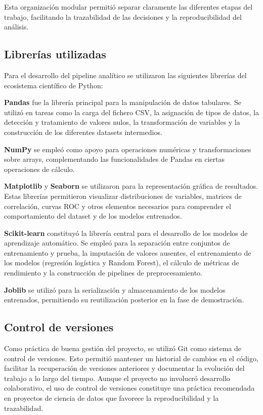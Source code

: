 \documentclass[12pt, a4paper, oneside]{report}
\begin{document}
Esta organización modular permitió separar claramente las diferentes etapas del trabajo, facilitando la trazabilidad de las decisiones y la reproducibilidad del análisis.

\subsection{Librerías utilizadas}

Para el desarrollo del pipeline analítico se utilizaron las siguientes librerías del ecosistema científico de Python:

\textbf{Pandas} fue la librería principal para la manipulación de datos tabulares. Se utilizó en tareas como la carga del fichero CSV, la asignación de tipos de datos, la detección y tratamiento de valores nulos, la transformación de variables y la construcción de los diferentes datasets intermedios.

\textbf{NumPy} se empleó como apoyo para operaciones numéricas y transformaciones sobre arrays, complementando las funcionalidades de Pandas en ciertas operaciones de cálculo.

\textbf{Matplotlib} y \textbf{Seaborn} se utilizaron para la representación gráfica de resultados. Estas librerías permitieron visualizar distribuciones de variables, matrices de correlación, curvas ROC y otros elementos necesarios para comprender el comportamiento del dataset y de los modelos entrenados.

\textbf{Scikit-learn} constituyó la librería central para el desarrollo de los modelos de aprendizaje automático. Se empleó para la separación entre conjuntos de entrenamiento y prueba, la imputación de valores ausentes, el entrenamiento de los modelos (regresión logística y Random Forest), el cálculo de métricas de rendimiento y la construcción de pipelines de preprocesamiento.

\textbf{Joblib} se utilizó para la serialización y almacenamiento de los modelos entrenados, permitiendo su reutilización posterior en la fase de demostración.

\subsection{Control de versiones}

Como práctica de buena gestión del proyecto, se utilizó Git como sistema de control de versiones. Esto permitió mantener un historial de cambios en el código, facilitar la recuperación de versiones anteriores y documentar la evolución del trabajo a lo largo del tiempo. Aunque el proyecto no involucró desarrollo colaborativo, el uso de control de versiones constituye una práctica recomendada en proyectos de ciencia de datos que favorece la reproducibilidad y la trazabilidad.
\end{document}
